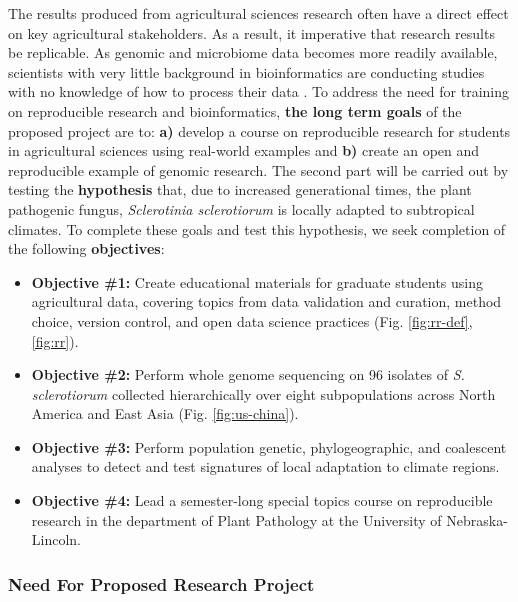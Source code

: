 \documentclass[12pt,letterpaper]{article}
\begin{document}
The results produced from agricultural sciences research often have a direct effect on key agricultural stakeholders. 
As a result, it imperative that research results be replicable. 
As genomic and microbiome data becomes more readily available, scientists with very little background in bioinformatics are conducting studies with no knowledge of how to process their data \citep{stewart-lowndes2017path, barone2017unmet}. 
To address the need for training on reproducible research and bioinformatics, \textbf{the long term goals} of the proposed project are to: \textbf{a)} develop a course on reproducible research for students in agricultural sciences using real-world examples and \textbf{b)} create an open and reproducible example of genomic research. The second part will be carried out by testing the \textbf{hypothesis} that, due to increased generational times, the plant pathogenic fungus, \textit{Sclerotinia sclerotiorum} is locally adapted to subtropical climates.
To complete these goals and test this hypothesis, we seek completion of the following \textbf{objectives}:
\begin{itemize}
  \item \textbf{Objective \#1:} Create educational materials for graduate students using agricultural data, covering topics from data validation and curation, method choice, version control, and open data science practices (Fig. \ref{fig:rr-def}, \ref{fig:rr}).
  \item \textbf{Objective \#2:} Perform whole genome sequencing on 96 isolates of \textit{S. sclerotiorum} collected hierarchically over eight subpopulations across North America and East Asia (Fig. \ref{fig:us-china}).
  \item \textbf{Objective \#3:} Perform population genetic, phylogeographic, and coalescent analyses to detect and test signatures of local adaptation to climate regions.
  \item \textbf{Objective \#4:} Lead a semester-long special topics course on reproducible research in the department of Plant Pathology at the University of Nebraska-Lincoln.
\end{itemize}

\subsubsection*{Need For Proposed Research Project}
\end{document}
